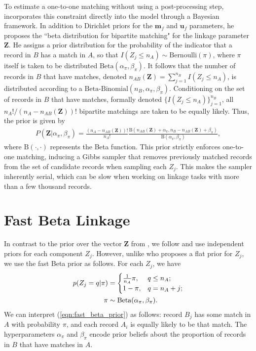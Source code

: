 \documentclass[ba]{imsart}
\begin{document}
To estimate a one-to-one matching without using a post-processing step, \cite{sadinle_bayesian_2017} incorporates this constraint directly into the model through a Bayesian framework. In addition to {\color{red}{uniform}} Dirichlet priors for the $\bm{m}_f$ and $\bm{u}_f$ parameters, he proposes the ``beta distribution for bipartite matching" for the linkage parameter $\bm{Z}$. He assigns a prior distribution for the probability of the indicator that a record in $B$ has a match in $A$, so that $I(Z_j \leq n_A) \sim \text{Bernoulli}(\pi)$, where $\pi$ itself is taken to be distributed $\text{Beta}(\alpha_{\pi}, \beta_{\pi})$. It follows that the number of records in $B$ that have matches, denoted $n_{AB}(\bm{Z}) = \sum_{j=1}^{n_B} I(Z_j \leq n_A)$, is distributed according to a $\text{Beta-Binomial}(n_B, \alpha_{\pi}, \beta_{\pi})$. Conditioning on the set of records in $B$ that have matches, formally denoted $\{I(Z_j \leq n_A)\}_{j=1}^{n_B}$, all $n_A ! / (n_A - n_{AB}(\bm{Z}))!$ bipartite matchings are taken to be equally likely. Thus, the prior is given by
\begin{align}
\label{eqn:sadinle_prior}
P(\bm{Z}|\alpha_{\pi}, \beta_{\pi}) = \frac{(n_A - n_{AB}(\bm{Z}))!}{n_A !}\frac{\text{B}(n_{AB}(\bm{Z}) + \alpha_{\pi}, n_B - n_{AB}(\bm{Z}) + \beta_{\pi})}{\text{B}(\alpha_{\pi}, \beta_{\pi})},
\end{align}
where $\text{B}(\cdot, \cdot)$ represents the Beta function. This prior strictly enforces one-to-one matching, inducing a Gibbs sampler that removes previously matched records from the set of candidate records when sampling each $Z_j$. This makes the sampler inherently serial, which can be slow when working on linkage tasks with more than a few thousand records.

\section{Fast Beta Linkage}
\label{sec:fast-beta-linkage}

In contrast to the prior over the vector $\bm{Z}$ from \cite{sadinle_bayesian_2017}, we follow \cite{wortman2019} and use independent priors for each component $Z_j$. However, unlike \cite{wortman2019} who proposes a flat prior for $Z_j$, we use the fast Beta prior as follows. For each $Z_j$, we have
\begin{align}
	\label{eqn:fast_beta_prior}
	p(Z_j = q| \pi) &= \begin{cases} 
	\frac{1}{n_A}\pi,  & q \leq n_A; \\
	1-\pi, &  q  = n_A + j; \\
\end{cases} \\
\pi &\sim \text{Beta}(\alpha_{\pi}, \beta_{\pi}) \notag.
\end{align}
We can interpret (\ref{eqn:fast_beta_prior}) as follows: record $B_j$ has some match in $A$ with probability $\pi$, and each record $A_i$ is equally likely to be that match. The hyperparameters $\alpha_{\pi}$ and $\beta_{\pi}$ encode prior beliefs about  the proportion of records in $B$ that have matches in $A.$ 
\end{document}
